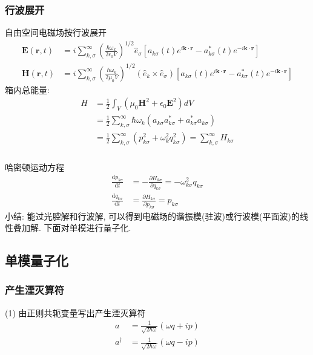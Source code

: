 \begin{frame}
  \frametitle{行波展开}
  自由空间电磁场按行波展开
  \[   \begin{aligned}
    \mathbf{E} (\mathbf{r},t) &=i \sum^\infty _{k,\sigma} (\frac{\hbar\omega_k}{2 \epsilon_0 V } )^{1/2} \hat{e}_\sigma [ a_{k\sigma} (t) e^{i \mathbf{k}\cdot \mathbf{r}} - a ^* _{k\sigma} (t)  e^{-i \mathbf{k}\cdot \mathbf{r}}] \\
  \mathbf{H} (\mathbf{r},t) &=i \sum^\infty _{k,\sigma} (\frac{\hbar\omega_k}{2 \mu_0 V } )^{1/2} (\hat{e}_k \times \hat{e}_\sigma) [ a_{k\sigma} (t) e^{i \mathbf{k}\cdot \mathbf{r}} - a ^* _{k\sigma} (t)  e^{-i \mathbf{k}\cdot \mathbf{r}}] 
\end{aligned} 
  \]
  箱内总能量:
  \[ \begin{aligned}
    H &= \frac{1}{2} \int_V (\mu_0 \mathbf{H}^2 + \epsilon_0 \mathbf{E}^2) dV \\ 
    &= \frac{1}{2}\sum^\infty _{k,\sigma} \hbar \omega_k (a_{k\sigma} a_{k\sigma} ^* + a_{k\sigma} ^*a_{k\sigma} )   \\ 
    &= \frac{1}{2}\sum^\infty _{k,\sigma} (p_{k\sigma} ^2 + \omega_k ^2 q_{k\sigma} ^2 )  = \sum^\infty _{k,\sigma} H_{k\sigma}
 \end{aligned} 
\] 
\end{frame}

\begin{frame}
    \frametitle{}
    哈密顿运动方程
    \[ \begin{aligned}
        \frac{\mathrm{d}p_{k\sigma}}{\mathrm{d}t} &= - \frac{\partial H_{k\sigma}}{\partial q_{k\sigma}} = - \omega ^2 _{k\sigma} q_{k\sigma} \\ 
        \frac{\mathrm{d}q_{k\sigma}}{\mathrm{d}t} &= \frac{\partial H_{k\sigma}}{\partial p_{k\sigma}} =p_{k\sigma}
     \end{aligned} 
    \] 
    小结: 能过光腔解和行波解, 可以得到电磁场的谐振模(驻波)或行波模(平面波)的线性叠加解. 下面对单模进行量子化.
\end{frame}

\subsection{单模量子化}

\begin{frame}
  \frametitle{产生湮灭算符}
(1) 由正则共轭变量写出产生湮灭算符
 \[\begin{aligned}
  a &= \frac{1}{\sqrt{2\hbar \omega}} (\omega q+i p) \\ 
  a ^\dagger &= \frac{1}{\sqrt{2\hbar \omega}} (\omega q - i p)
  \end{aligned}\]
\end{frame}


